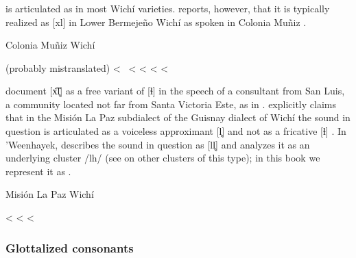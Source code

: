 \subsubsection{}

 is articulated as  in most Wichí varieties. \citet[137--138]{MC09} reports, however, that it is typically realized as [xl] in Lower Bermejeño Wichí as spoken in Colonia Muñiz .

\ea\label{wi:lh:cm}
Colonia Muñiz Wichí \citep[137--8]{MC09}\\
    \begin{xlist}
        \ex {} (probably mistranslated) <~ 
        \ex {} < 
        \ex {} < 
        \ex {} < 
        \ex {} < 
    \end{xlist}
\z
{}

\citet[162]{AFG-SS-09} document [x͡l̥] as a free variant of [ɬ] in the speech of a consultant from San Luis, a community located not far from Santa Victoria Este, as in . \citet[50–51]{MA08} explicitly claims that in the Misión La Paz subdialect of the Guisnay dialect of Wichí the sound in question is articulated as a voiceless approximant [l̥] and not as a fricative [ɬ] . In ’Weenhayek, \citet[31]{KC94} describes the sound in question as [ll̥] and analyzes it as an underlying cluster /lh/ (see  on other clusters of this type); in this book we represent it as .

\ea\label{wi:lh:mlp}
Misión La Paz Wichí \citep[50–51]{MA08} \\
    \begin{xlist}
        \ex {} < 
        \ex {} < 
        \ex {} < 
    \end{xlist}
\z
{}

\subsubsection{Glottalized consonants}\label{wi-gl-cons}


